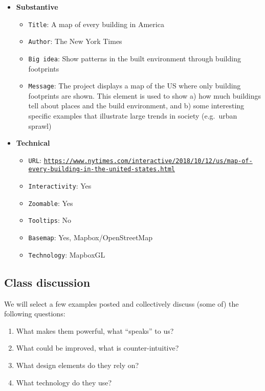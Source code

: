 \documentclass[
  letterpaper,
  DIV=11,
  numbers=noendperiod]{scrreprt}
\begin{document}
\begin{itemize}
\item
  \textbf{Substantive}

  \begin{itemize}
  \item
    \texttt{Title}: A map of every building in America
  \item
    \texttt{Author}: The New York Times
  \item
    \texttt{Big\ idea}: Show patterns in the built environment through
    building footprints
  \item
    \texttt{Message}: The project displays a map of the US where only
    building footprints are shown. This element is used to show a) how
    much buildings tell about places and the build environment, and b)
    some interesting specific examples that illustrate large trends in
    society (e.g.~urban sprawl)
  \end{itemize}
\item
  \textbf{Technical}

  \begin{itemize}
  \item
    \texttt{URL}:
    \href{https://www.nytimes.com/interactive/2018/10/12/us/map-of-every-building-in-the-united-states.html}{\texttt{https://www.nytimes.com/interactive/2018/10/12/us/map-of-every-building-in-the-united-states.html}}
  \item
    \texttt{Interactivity}: Yes
  \item
    \texttt{Zoomable}: Yes
  \item
    \texttt{Tooltips}: No
  \item
    \texttt{Basemap}: Yes, Mapbox/OpenStreetMap
  \item
    \texttt{Technology}: MapboxGL
  \end{itemize}
\end{itemize}

\hypertarget{class-discussion}{%
\subsection{Class discussion}\label{class-discussion}}

We will select a few examples posted and collectively discuss (some of)
the following questions:

\begin{enumerate}
\def\labelenumi{\arabic{enumi}.}
\item
  What makes them powerful, what ``speaks'' to us?
\item
  What could be improved, what is counter-intuitive?
\item
  What design elements do they rely on?
\item
  What technology do they use?
\end{enumerate}
\end{document}
